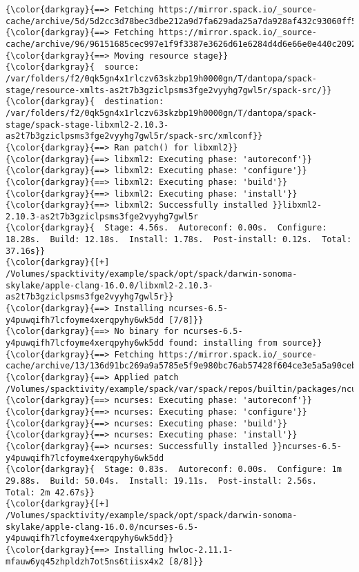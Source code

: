 \documentclass[10pt, oneside]{article}   	%
\begin{document}
{{\begin{Verbatim}[commandchars=\\\{\}]
{\color{darkgray}{==> Fetching https://mirror.spack.io/_source-cache/archive/5d/5d2cc3d78bec3dbe212a9d7fa629ada25a7da928af432c93060ff5c17ee28a9c.tar.xz}}
{\color{darkgray}{==> Fetching https://mirror.spack.io/_source-cache/archive/96/96151685cec997e1f9f3387e3626d61e6284d4d6e66e0e440c209286c03e9cc7.tar.gz}}
{\color{darkgray}{==> Moving resource stage}}
{\color{darkgray}{	source: /var/folders/f2/0qk5gn4x1rlczv63skzbp19h0000gn/T/dantopa/spack-stage/resource-xmlts-as2t7b3gziclpsms3fge2vyyhg7gwl5r/spack-src/}}
{\color{darkgray}{	destination: /var/folders/f2/0qk5gn4x1rlczv63skzbp19h0000gn/T/dantopa/spack-stage/spack-stage-libxml2-2.10.3-as2t7b3gziclpsms3fge2vyyhg7gwl5r/spack-src/xmlconf}}
{\color{darkgray}{==> Ran patch() for libxml2}}
{\color{darkgray}{==> libxml2: Executing phase: 'autoreconf'}}
{\color{darkgray}{==> libxml2: Executing phase: 'configure'}}
{\color{darkgray}{==> libxml2: Executing phase: 'build'}}
{\color{darkgray}{==> libxml2: Executing phase: 'install'}}
{\color{darkgray}{==> libxml2: Successfully installed }}libxml2-2.10.3-as2t7b3gziclpsms3fge2vyyhg7gwl5r
{\color{darkgray}{  Stage: 4.56s.  Autoreconf: 0.00s.  Configure: 18.28s.  Build: 12.18s.  Install: 1.78s.  Post-install: 0.12s.  Total: 37.16s}}
{\color{darkgray}{[+] /Volumes/spacktivity/example/spack/opt/spack/darwin-sonoma-skylake/apple-clang-16.0.0/libxml2-2.10.3-as2t7b3gziclpsms3fge2vyyhg7gwl5r}}
{\color{darkgray}{==> Installing ncurses-6.5-y4puwqifh7lcfoyme4xerqpyhy6wk5dd [7/8]}}
{\color{darkgray}{==> No binary for ncurses-6.5-y4puwqifh7lcfoyme4xerqpyhy6wk5dd found: installing from source}}
{\color{darkgray}{==> Fetching https://mirror.spack.io/_source-cache/archive/13/136d91bc269a9a5785e5f9e980bc76ab57428f604ce3e5a5a90cebc767971cc6.tar.gz}}
{\color{darkgray}{==> Applied patch /Volumes/spacktivity/example/spack/var/spack/repos/builtin/packages/ncurses/rxvt_unicode_6_4.patch}}
{\color{darkgray}{==> ncurses: Executing phase: 'autoreconf'}}
{\color{darkgray}{==> ncurses: Executing phase: 'configure'}}
{\color{darkgray}{==> ncurses: Executing phase: 'build'}}
{\color{darkgray}{==> ncurses: Executing phase: 'install'}}
{\color{darkgray}{==> ncurses: Successfully installed }}ncurses-6.5-y4puwqifh7lcfoyme4xerqpyhy6wk5dd
{\color{darkgray}{  Stage: 0.83s.  Autoreconf: 0.00s.  Configure: 1m 29.88s.  Build: 50.04s.  Install: 19.11s.  Post-install: 2.56s.  Total: 2m 42.67s}}
{\color{darkgray}{[+] /Volumes/spacktivity/example/spack/opt/spack/darwin-sonoma-skylake/apple-clang-16.0.0/ncurses-6.5-y4puwqifh7lcfoyme4xerqpyhy6wk5dd}}
{\color{darkgray}{==> Installing hwloc-2.11.1-mfauw6yq45zhpldzh7ot5ns6tiisx4x2 [8/8]}}

\end{Verbatim}}}
\end{document}
